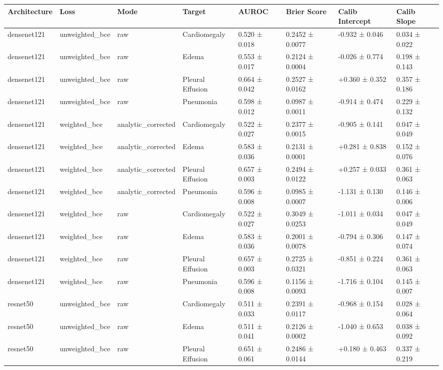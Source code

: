\begin{tabular}{llllllll}
\toprule
Architecture & Loss & Mode & Target & AUROC & Brier Score & Calib Intercept & Calib Slope \\
\midrule
densenet121 & unweighted_bce & raw & Cardiomegaly & 0.520 ± 0.018 & 0.2452 ± 0.0077 & -0.932 ± 0.046 & 0.034 ± 0.022 \\
densenet121 & unweighted_bce & raw & Edema & 0.553 ± 0.017 & 0.2124 ± 0.0004 & -0.026 ± 0.774 & 0.198 ± 0.143 \\
densenet121 & unweighted_bce & raw & Pleural Effusion & 0.664 ± 0.042 & 0.2527 ± 0.0162 & +0.360 ± 0.352 & 0.357 ± 0.186 \\
densenet121 & unweighted_bce & raw & Pneumonia & 0.598 ± 0.012 & 0.0987 ± 0.0011 & -0.914 ± 0.474 & 0.229 ± 0.132 \\
densenet121 & weighted_bce & analytic_corrected & Cardiomegaly & 0.522 ± 0.027 & 0.2377 ± 0.0015 & -0.905 ± 0.141 & 0.047 ± 0.049 \\
densenet121 & weighted_bce & analytic_corrected & Edema & 0.583 ± 0.036 & 0.2131 ± 0.0001 & +0.281 ± 0.838 & 0.152 ± 0.076 \\
densenet121 & weighted_bce & analytic_corrected & Pleural Effusion & 0.657 ± 0.003 & 0.2494 ± 0.0122 & +0.257 ± 0.033 & 0.361 ± 0.063 \\
densenet121 & weighted_bce & analytic_corrected & Pneumonia & 0.596 ± 0.008 & 0.0985 ± 0.0007 & -1.131 ± 0.130 & 0.146 ± 0.006 \\
densenet121 & weighted_bce & raw & Cardiomegaly & 0.522 ± 0.027 & 0.3049 ± 0.0253 & -1.011 ± 0.034 & 0.047 ± 0.049 \\
densenet121 & weighted_bce & raw & Edema & 0.583 ± 0.036 & 0.2001 ± 0.0078 & -0.794 ± 0.306 & 0.147 ± 0.074 \\
densenet121 & weighted_bce & raw & Pleural Effusion & 0.657 ± 0.003 & 0.2725 ± 0.0321 & -0.851 ± 0.224 & 0.361 ± 0.063 \\
densenet121 & weighted_bce & raw & Pneumonia & 0.596 ± 0.008 & 0.1156 ± 0.0093 & -1.716 ± 0.104 & 0.145 ± 0.007 \\
resnet50 & unweighted_bce & raw & Cardiomegaly & 0.511 ± 0.033 & 0.2391 ± 0.0117 & -0.968 ± 0.154 & 0.028 ± 0.064 \\
resnet50 & unweighted_bce & raw & Edema & 0.511 ± 0.041 & 0.2126 ± 0.0002 & -1.040 ± 0.653 & 0.038 ± 0.092 \\
resnet50 & unweighted_bce & raw & Pleural Effusion & 0.651 ± 0.061 & 0.2486 ± 0.0144 & +0.180 ± 0.463 & 0.337 ± 0.219 \\

\end{tabular}
